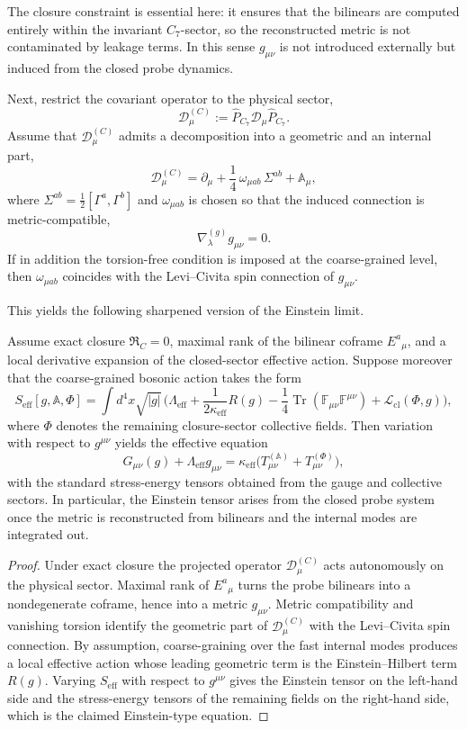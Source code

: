 The closure constraint is essential here: it ensures that the bilinears are
computed entirely within the invariant $C_7$-sector, so the reconstructed
metric is not contaminated by leakage terms. In this sense $g_{\mu\nu}$ is not
introduced externally but induced from the closed probe dynamics.

Next, restrict the covariant operator to the physical sector,
\[
  \mathcal D^{(C)}_\mu := \hat P_{C_7}\mathcal D_\mu \hat P_{C_7}.
\]
Assume that $\mathcal D^{(C)}_\mu$ admits a decomposition into a geometric and an
internal part,
\[
  \mathcal D^{(C)}_\mu
  = \partial_\mu + \frac14 \, \omega_{\mu ab}\,\Sigma^{ab} + \mathbb A_\mu,
\]
where $\Sigma^{ab}=\frac12[\Gamma^a,\Gamma^b]$ and $\omega_{\mu ab}$ is chosen so
that the induced connection is metric-compatible,
\[
  \nabla^{(g)}_\lambda g_{\mu\nu}=0.
\]
If in addition the torsion-free condition is imposed at the coarse-grained
level, then $\omega_{\mu ab}$ coincides with the Levi--Civita spin connection of
$g_{\mu\nu}$.

This yields the following sharpened version of the Einstein limit.

\begin{proposition}
\label{prop:bilinear-einstein-reconstruction}
Assume exact closure $\mathfrak R_C=0$, maximal rank of the bilinear coframe
$E^a{}_{\mu}$, and a local derivative expansion of the closed-sector effective
action. Suppose moreover that the coarse-grained bosonic action takes the form
\[
  S_{\mathrm{eff}}[g,\mathbb A,\Phi]
  = \int d^4x\sqrt{|g|}\,\bigl(
      \Lambda_{\mathrm{eff}}
      + \frac{1}{2\kappa_{\mathrm{eff}}}R(g)
      - \frac14\operatorname{Tr}(\mathbb F_{\mu\nu}\mathbb F^{\mu\nu})
      + \mathcal L_{\mathrm{cl}}(\Phi,g)
    \bigr),
\]
where $\Phi$ denotes the remaining closure-sector collective fields.
Then variation with respect to $g^{\mu\nu}$ yields the effective equation
\[
  G_{\mu\nu}(g) + \Lambda_{\mathrm{eff}}g_{\mu\nu}
  = \kappa_{\mathrm{eff}}
    \bigl(T^{(\mathbb A)}_{\mu\nu} + T^{(\Phi)}_{\mu\nu}\bigr),
\]
with the standard stress-energy tensors obtained from the gauge and collective
sectors. In particular, the Einstein tensor arises from the closed probe
system once the metric is reconstructed from bilinears and the internal modes
are integrated out.
\end{proposition}

\begin{proof}
Under exact closure the projected operator $\mathcal D^{(C)}_\mu$ acts
autonomously on the physical sector. Maximal rank of $E^a{}_{\mu}$ turns the
probe bilinears into a nondegenerate coframe, hence into a metric
$g_{\mu\nu}$. Metric compatibility and vanishing torsion identify the geometric
part of $\mathcal D^{(C)}_\mu$ with the Levi--Civita spin connection.
By assumption, coarse-graining over the fast internal modes produces a local
effective action whose leading geometric term is the Einstein--Hilbert term
$R(g)$. Varying $S_{\mathrm{eff}}$ with respect to $g^{\mu\nu}$ gives the Einstein
tensor on the left-hand side and the stress-energy tensors of the remaining
fields on the right-hand side, which is the claimed Einstein-type equation.
\end{proof}

